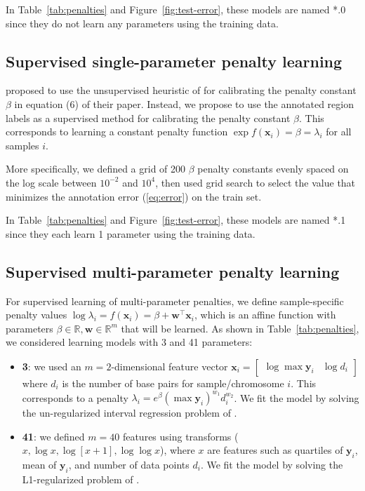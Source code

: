 \documentclass{article}
\newcommand{\RR}{\mathbb R}
\begin{document}
In Table~\ref{tab:penalties} and Figure~\ref{fig:test-error}, these
models are named *.0 since they do not learn any parameters using the
training data.

\subsection{Supervised single-parameter penalty learning}
\label{sec:supervised-single}

\citet{cleynen2013segmentation} proposed to use the un\-supervised
heuristic of \citet{arlot2009data} for calibrating the penalty constant
$\beta$ in equation (6) of their paper. Instead, we propose to use the
annotated region labels as a super\-vised method for calibrating the
penalty constant $\beta$. This corresponds to learning a constant
penalty function $\exp f(\mathbf x_i) = \beta = \lambda_i$ for all
samples $i$.

More specifically, we defined a grid of 200 $\beta$ penalty constants
evenly spaced on the log scale between $10^{-2}$ and $10^4$, then used
grid search to select the value that minimizes the annotation error
(\ref{eq:error}) on the train set.

In Table~\ref{tab:penalties} and Figure~\ref{fig:test-error}, these
models are named *.1 since they each learn 1 parameter using the
training data.

\subsection{Supervised multi-parameter penalty learning}
\label{sec:supervised-multi}

For supervised learning of multi-parameter penalties, we
define sample-specific penalty values $\log \lambda_i = f(\mathbf
x_i)= \beta + \mathbf w^\intercal \mathbf x_i$, which is an affine
function with parameters $\beta\in\RR,\mathbf w\in\RR^m$ that will be
learned. As shown in Table~\ref{tab:penalties}, we considered learning
models with 3 and 41 parameters:

\begin{itemize}
\item \textbf{3}: we used an $m=2$-dimensional feature
  vector $\mathbf x_i = \left[\begin{array}{cc} \log\max \mathbf y_i &
      \log d_i
\end{array}\right]$ where $d_i$ is the number of base pairs for 
sample/chromosome $i$.  This corresponds to a penalty $\lambda_i =
e^\beta (\max\mathbf y_i)^{w_1} d_i^{w_2}$. We fit the model by
solving the un-regularized interval regression problem of
\citet{HOCKING-penalties}.
\item \textbf{41}: we defined $m=40$ features using transforms ($x,
  \log x, \log[x+1], \log\log x$), where $x$ are features such as
  quartiles of $\mathbf y_i$, mean of $\mathbf y_i$, and
  number of data points $d_i$. We fit the model by solving
  the L1-regularized problem of
  \citet{HOCKING-penalties}.
\end{itemize}
\end{document}
